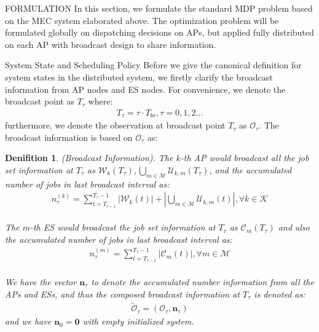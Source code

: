 \documentclass[10pt, conference, letterpaper]{IEEEtran}
\newtheorem{definition}{Denifition}
\renewcommand{\vec}{\mathbf}
\newcommand{\apSet}{\mathcal{K}}
\newcommand{\esSet}{\mathcal{M}}
\newcommand{\wSet}{\mathcal{W}}
\newcommand{\uSet}{\mathcal{U}}
\newcommand{\cSet}{\mathcal{C}}
\newcommand{\Obsv}{\mathcal{O}}
\begin{document}
    \begin{section}{FORMULATION}
        \label{sec:formulation}
        In this section, we formulate the standard MDP problem based on the MEC system elaborated above. The optimization problem will be formulated globally on dispatching decisions on APs, but applied fully distributed on each AP with broadcast design to share information.

        \begin{subsection}{System State and Scheduling Policy}
            Before we give the canonical definition for system states in the distributed system, we firstly clarify the broadcast information from AP nodes and ES nodes. For convenience, we denote the broadcast point as $T_\tau$ where:
            \begin{align}
                T_\tau = \tau \cdot T_{br}, \tau=0,1,2\dots
            \end{align}
            furthermore, we denote the observation at broadcast point $T_\tau$ as $\Obsv_\tau$. The broadcast information is based on $\Obsv_\tau$ as:
            \begin{definition}(Broadcast Information).
                The $k$-th AP would broadcast all the job set information at $T_\tau$ as $\wSet_{k}(T_\tau), \bigcup\limits_{m\in\esSet}\uSet_{k,m}(T_\tau)$, and the accumulated number of jobs in last broadcast interval as:
                \begin{align}
                    n^{(k)}_\tau = \sum_{t=T_{\tau-1}}^{T_\tau-1} |\wSet_{k}(t)| + |\bigcup\limits_{m\in\esSet}\uSet_{k,m}(t)|,\forall k \in \apSet
                \end{align}
                \\
                The $m$-th ES would broadcast the job set information at $T_\tau$ as $\cSet_{m}(T_\tau)$ and also the accumulated number of jobs in last broadcast interval as:
                \begin{align}
                    n^{(m)}_\tau = \sum_{t=T_{\tau-1}}^{T_\tau-1} |\cSet_{m}(t)|,\forall m \in \esSet
                \end{align}
                \\
                We have the vector $\vec{n}_\tau$ to denote the accumulated number information from all the APs and ESs, and thus the composed broadcast information at $T_\tau$ is denoted as:
                \begin{align}
                    \tilde{\Obsv}_{\tau} = (\Obsv_\tau, \vec{n}_\tau)
                \end{align}
                and we have $\vec{n}_0 = \mathbf{0}$ with empty initialized system.
            \end{definition}


\end{subsection}
\end{section}
\end{document}
